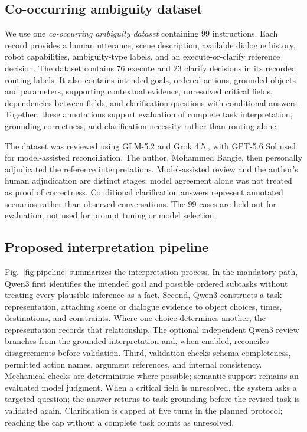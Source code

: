 \documentclass[10pt,conference]{IEEEtran}
\begin{document}
\subsection{Co-occurring ambiguity dataset}
We use one \emph{co-occurring ambiguity dataset} containing 99 instructions. Each record provides a human utterance, scene description, available dialogue history, robot capabilities, ambiguity-type labels, and an execute-or-clarify reference decision. The dataset contains 76 execute and 23 clarify decisions in its recorded routing labels. It also contains intended goals, ordered actions, grounded objects and parameters, supporting contextual evidence, unresolved critical fields, dependencies between fields, and clarification questions with conditional answers. Together, these annotations support evaluation of complete task interpretation, grounding correctness, and clarification necessity rather than routing alone.

The dataset was reviewed using GLM-5.2 \cite{glm52} and Grok 4.5 \cite{grok45}, with GPT-5.6 Sol \cite{gpt56sol} used for model-assisted reconciliation. The author, Mohammed Bangie, then personally adjudicated the reference interpretations. Model-assisted review and the author's human adjudication are distinct stages; model agreement alone was not treated as proof of correctness. Conditional clarification answers represent annotated scenarios rather than observed conversations. The 99 cases are held out for evaluation, not used for prompt tuning or model selection.

\subsection{Proposed interpretation pipeline}
Fig.~\ref{fig:pipeline} summarizes the interpretation process. In the mandatory path, Qwen3 first identifies the intended goal and possible ordered subtasks without treating every plausible inference as a fact. Second, Qwen3 constructs a task representation, attaching scene or dialogue evidence to object choices, times, destinations, and constraints. Where one choice determines another, the representation records that relationship. The optional independent Qwen3 review branches from the grounded interpretation and, when enabled, reconciles disagreements before validation. Third, validation checks schema completeness, permitted action names, argument references, and internal consistency. Mechanical checks are deterministic where possible; semantic support remains an evaluated model judgment. When a critical field is unresolved, the system asks a targeted question; the answer returns to task grounding before the revised task is validated again. Clarification is capped at five turns in the planned protocol; reaching the cap without a complete task counts as unresolved.
\end{document}
